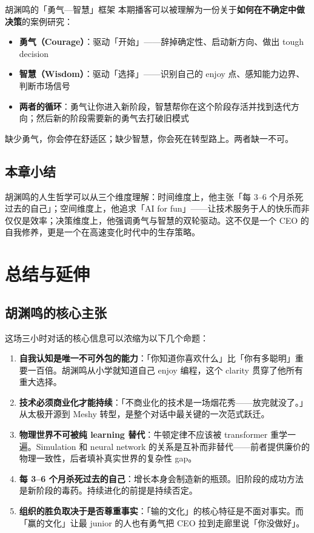 \documentclass[a4paper]{article}
\begin{document}
\begin{importantbox}{胡渊鸣的「勇气—智慧」框架}
本期播客可以被理解为一份关于\textbf{如何在不确定中做决策}的案例研究：
\begin{itemize}
    \item \textbf{勇气（Courage）}：驱动「开始」——辞掉确定性、启动新方向、做出 tough decision
    \item \textbf{智慧（Wisdom）}：驱动「选择」——识别自己的 enjoy 点、感知能力边界、判断市场信号
    \item \textbf{两者的循环}：勇气让你进入新阶段，智慧帮你在这个阶段存活并找到迭代方向；然后新的阶段需要新的勇气去打破旧模式
\end{itemize}
缺少勇气，你会停在舒适区；缺少智慧，你会死在转型路上。两者缺一不可。
\end{importantbox}

\subsection{本章小结}
胡渊鸣的人生哲学可以从三个维度理解：时间维度上，他主张「每 3--6 个月杀死过去的自己」；空间维度上，他追求「AI for fun」——让技术服务于人的快乐而非仅仅是效率；决策维度上，他强调勇气与智慧的双轮驱动。这不仅是一个 CEO 的自我修养，更是一个在高速变化时代中的生存策略。

\section{总结与延伸}

\subsection{胡渊鸣的核心主张}

这场三小时对话的核心信息可以浓缩为以下几个命题：

\begin{enumerate}
    \item \textbf{自我认知是唯一不可外包的能力}：「你知道你喜欢什么」比「你有多聪明」重要一百倍。胡渊鸣从小学就知道自己 enjoy 编程，这个 clarity 贯穿了他所有重大选择。
    \item \textbf{技术必须商业化才能持续}：「不商业化的技术是一场烟花秀——放完就没了。」从太极开源到 Meshy 转型，是整个对话中最关键的一次范式跃迁。
    \item \textbf{物理世界不可被纯 learning 替代}：牛顿定律不应该被 transformer 重学一遍。Simulation 和 neural network 的关系是互补而非替代——前者提供廉价的物理一致性，后者填补真实世界的复杂性 gap。
    \item \textbf{每 3--6 个月杀死过去的自己}：增长本身会制造新的瓶颈。旧阶段的成功方法是新阶段的毒药。持续进化的前提是持续否定。
    \item \textbf{组织的胜负取决于是否尊重事实}：「输的文化」的核心特征是不面对事实。而「赢的文化」让最 junior 的人也有勇气把 CEO 拉到走廊里说「你没做好」。
\end{enumerate}
\end{document}
